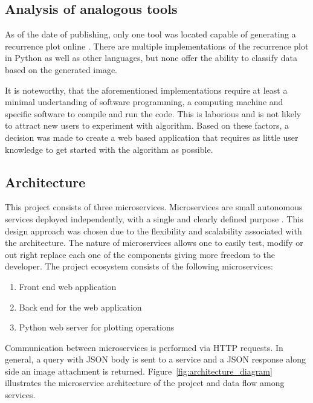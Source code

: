 \documentclass[a4paper,12pt,fleqn]{article}
\begin{document}
\subsection{Analysis of analogous tools}
As of the date of publishing, only one tool was located capable
of generating a recurrence plot online \cite{recurrence_plot_tk}.
There are multiple implementations of the recurrence plot in Python as well as other
languages, but none offer the ability to classify data based on the generated image.

It is noteworthy, that the aforementioned implementations require at least a minimal undertanding of software programming, a computing machine and specific software to compile and run the code.
This is laborious and is not likely to attract new users to experiment with algorithm.
Based on these factors, a decision was made to create a web based application that requires
as little user knowledge to get started with the algorithm as possible.


\subsection{Architecture}
This project consists of three microservices.
Microservices are small autonomous services deployed independently, with a single and clearly defined purpose \cite{krause2015microservices}. This design approach was chosen due to the flexibility and scalability associated with the architecture. %
The nature of microservices allows one to easily test, modify or out right replace each one of the components giving more freedom to the developer.
The project ecosystem consists of the following microservices:
\begin{enumerate}
  \item Front end web application
  \item Back end for the web application
  \item Python web server for plotting operations
\end{enumerate}

Communication between microservices is performed via HTTP requests. In general, a query with JSON body is sent to a service and a JSON response along side an image attachment is returned.
Figure~\ref{fig:architecture_diagram} illustrates the microservice architecture of the project and data flow among services.
\end{document}
